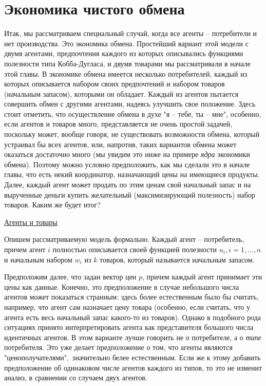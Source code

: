 

\section*{Экономика чистого обмена}

Итак, мы рассматриваем специальный случай, когда все агенты -- потребители и нет производства.
Это экономика обмена. Простейший вариант этой модели с двумя агентами,
предпочтения каждого из которых описывались функциями полезности
типа Кобба-Дугласа, и двумя товарами мы рассматривали в начале этой главы.
В экономике обмена имеется несколько потребителей, каждый из которых
описывается набором своих предпочтений и набором товаров (начальным запасом),
которыми он обладает. Каждый из агентов
пытается совершить обмен с другими агентами, надеясь улучшить свое положение.
Здесь стоит отметить, что осуществление обмена в духе "я -- тебе, ты -- мне",
особенно, если агентов и товаров много, представляется не очень простой
задачей, поскольку может, вообще говоря, не существовать возможности обмена,
который устраивал бы всех агентов, или, напротив, таких вариантов обмена может оказаться
достаточно много (мы увидим это ниже на примере \emph{ядра} экономики обмена).
Поэтому можно условно предположить, как мы сделали это в начале главы, что есть
некий координатор, назначающий цены на имеющиеся продукты. Далее, каждый агент
может продать по этим ценам свой начальный запас и на вырученные деньги
купить желательный (максимизирующий полезность) набор товаров.
Каким же будет итог?


\underline{Агенты и товары}

Опишем рассматриваемую модель формально.
Каждый агент -- потребитель, причем агент $i$ полностью
описывается своей функцией
полезности $u_i, i=1,\ldots,n$ и начальным набором $w_i$ из $k$ товаров,
который называется начальным запасом.

Предположим далее, что задан вектор цен $p$, причем каждый агент
принимает эти цены как данные. Конечно, это предположение в случае
небольшого числа агентов может показаться странным:
здесь более естественным было бы считать, например, что агент сам
назначает цену товара (особенно, если считать, что у агента есть
весь начальный запас какого-то из товаров). Однако в подобного рода
ситуациях принято интерпретировать агента как представителя большого
числа идентичных агентов. В этом варианте лучше говорить не о потребителе,
а о \emph{типе} потребителя. Это уже делает предположение о том, что
агенты являются "ценополучателями",\, значительно белее естественным.
Если же к этому добавить предположение об одинаковом числе агентов каждого из
типов, то это не изменит анализ, в сравнении со случаем двух агентов.



